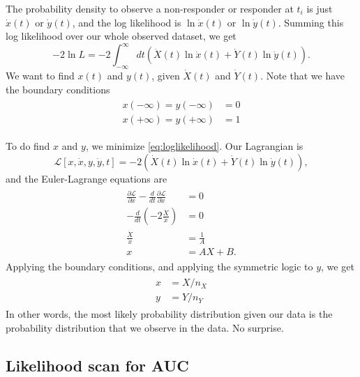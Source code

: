 \documentclass[11pt]{article}
\newcommand{\xdot}{\dot{x}}
\newcommand{\ydot}{\dot{y}}
\newcommand{\Xdot}{\dot{X}}
\newcommand{\Ydot}{\dot{Y}}
\begin{document}
The probability density to observe a non-responder or responder at \(t_i\) is just \(\xdot(t)\) or \(\ydot(t)\), and the log likelihood is \(\ln{\xdot(t)}\) or \(\ln{\ydot(t)}\).  Summing this log likelihood over our whole observed dataset, we get
\begin{equation}
	-2\ln{L}=-2\int_{-\infty}^{\infty}dt\left(\Xdot(t)\ln{\xdot(t)}+\Ydot(t)\ln{\ydot(t)}\right).
	\label{eq:loglikelihood}
\end{equation}
We want to find \(x(t)\) and \(y(t)\), given \(\Xdot(t)\) and \(\Ydot(t)\).  Note that we have the boundary conditions
\begin{align}
\begin{aligned}
	x(-\infty)=y(-\infty)&=0\\
	x(+\infty)=y(+\infty)&=1
\end{aligned}
\label{eq:boundaryconditions}
\end{align}

To do find \(x\) and \(y\), we minimize \cref{eq:loglikelihood}.  Our Lagrangian is
\begin{equation}
	\mathcal{L}[x,\xdot,y,\ydot,t]=-2\left(\Xdot(t)\ln{\xdot(t)}+\Ydot(t)\ln{\ydot(t)}\right),
	\label{eq:lagrangian}
\end{equation}
and the Euler-Lagrange equations are
\begin{align}
\begin{aligned}
	\frac{\partial\mathcal{L}}{\partial x}-\frac{d}{dt}\frac{\partial\mathcal{L}}{\partial \xdot}&=0 \\
	-\frac{d}{dt}\left(-2\frac{\Xdot}{\xdot}\right)&=0 \\
	\frac{\Xdot}{\xdot}&=\frac{1}{A} \\
	x&=AX+B.
\end{aligned}
\end{align}
Applying the boundary conditions, and applying the symmetric logic to \(y\), we get
\begin{align}
\begin{aligned}
	x&=X/n_X \\
	y&=Y/n_Y
\end{aligned}
\end{align}
In other words, the most likely probability distribution given our data is the probability distribution that we observe in the data.  No surprise.

\subsection{Likelihood scan for AUC}
\end{document}
